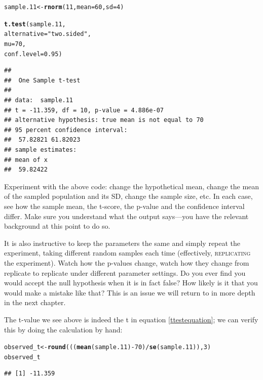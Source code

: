 \documentclass[12pt]{book}\usepackage[]{graphicx}\usepackage[]{color}
\makeatletter
\newcommand{\hlnum}[1]{\textcolor[rgb]{0.686,0.059,0.569}{#1}}%
\newcommand{\hlstr}[1]{\textcolor[rgb]{0.192,0.494,0.8}{#1}}%
\newcommand{\hlopt}[1]{\textcolor[rgb]{0,0,0}{#1}}%
\newcommand{\hlstd}[1]{\textcolor[rgb]{0.345,0.345,0.345}{#1}}%
\newcommand{\hlkwb}[1]{\textcolor[rgb]{0.69,0.353,0.396}{#1}}%
\newcommand{\hlkwc}[1]{\textcolor[rgb]{0.333,0.667,0.333}{#1}}%
\newcommand{\hlkwd}[1]{\textcolor[rgb]{0.737,0.353,0.396}{\textbf{#1}}}%
\newenvironment{kframe}{%
 \def\at@end@of@kframe{}%
 \ifinner\ifhmode%
  \def\at@end@of@kframe{\end{minipage}}%
  \begin{minipage}{\columnwidth}%
 \fi\fi%
 \def\FrameCommand##1{\hskip\@totalleftmargin \hskip-\fboxsep
 \colorbox{shadecolor}{##1}\hskip-\fboxsep
     \hskip-\linewidth \hskip-\@totalleftmargin \hskip\columnwidth}%
 \MakeFramed {\advance\hsize-\width
   \@totalleftmargin\z@ \linewidth\hsize
   \@setminipage}}%
 {\par\unskip\endMakeFramed%
 \at@end@of@kframe}
\newenvironment{knitrout}{}{} %
\makeatother
\begin{document}
\begin{knitrout}
\color{fgcolor}\begin{kframe}
\begin{alltt}
\hlstd{sample.11} \hlkwb{<-} \hlkwd{rnorm}\hlstd{(}\hlnum{11}\hlstd{,}\hlkwc{mean}\hlstd{=}\hlnum{60}\hlstd{,}\hlkwc{sd}\hlstd{=}\hlnum{4}\hlstd{)}

\hlkwd{t.test}\hlstd{(sample.11,}
       \hlkwc{alternative} \hlstd{=} \hlstr{"two.sided"}\hlstd{,}
       \hlkwc{mu} \hlstd{=} \hlnum{70}\hlstd{,}
       \hlkwc{conf.level} \hlstd{=} \hlnum{0.95}\hlstd{)}
\end{alltt}
\begin{verbatim}
## 
## 	One Sample t-test
## 
## data:  sample.11
## t = -11.359, df = 10, p-value = 4.886e-07
## alternative hypothesis: true mean is not equal to 70
## 95 percent confidence interval:
##  57.82821 61.82023
## sample estimates:
## mean of x 
##  59.82422
\end{verbatim}
\end{kframe}
\end{knitrout}

Experiment with the above code: change the hypothetical mean, change the mean of the sampled population and its SD, change the sample size, etc. In each case, see how the sample mean, the t-score, the p-value and the confidence interval differ. Make sure you understand what the output says---you have the relevant background at this point to do so.

It is also instructive to keep the parameters the same and simply repeat the experiment, taking different random samples each time (effectively, \textsc{replicating} the experiment). Watch how the p-values change, watch how they change from replicate to replicate under different parameter settings. Do you ever find you would accept the null hypothesis when it is in fact false? How likely is it that you would make a mistake like that? This is an issue we will return to in more depth in the next chapter.

The t-value we see above is indeed the t in equation \ref{ttestequation}; we can verify this by doing the calculation by hand:

\begin{knitrout}
\color{fgcolor}\begin{kframe}
\begin{alltt}
\hlstd{observed_t}\hlkwb{<-}\hlkwd{round}\hlstd{(((}\hlkwd{mean}\hlstd{(sample.11)}\hlopt{-}\hlnum{70}\hlstd{)}\hlopt{/}\hlkwd{se}\hlstd{(sample.11)),}\hlnum{3}\hlstd{)}
\hlstd{observed_t}
\end{alltt}
\begin{verbatim}
## [1] -11.359
\end{verbatim}
\end{kframe}
\end{knitrout}
\end{document}

